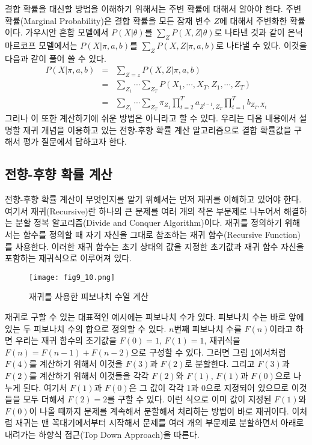 \documentclass[a4paper]{oblivoir}
\begin{document}
결합 확률을 대신할 방법을 이해하기 위해서는 주변 확률에 대해서 알아야 한다. 주변 확률(Marginal Probability)은 결합 확률을 모든 잠재 변수 $Z$에 대해서 주변화한 확률이다. 가우시안 혼합 모델에서 $P(X|\theta)$를 $\sum_{Z} P(X,Z|\theta)$로 나타낸 것과 같이 은닉 마르코프 모델에서는 $P(X|\pi,a,b)$를 $\sum_{Z} P(X,Z|\pi,a,b)$로 나타낼 수 있다. 이것을 다음과 같이 풀어 쓸 수 있다.
\begin{eqnarray}
P(X|\pi,a,b) & = & \sum_{Z=z} P(X,Z|\pi,a,b) \nonumber \\
& = & \sum_{Z_{1}} \cdots \sum_{Z_{T}} P(X_{1},\cdots,X_{T},Z_{1},\cdots,Z_{T}) \nonumber \\
& = & \sum_{Z_{1}} \cdots \sum_{Z_{T}} {\pi}_{Z_{1}} \prod_{t=2}^{T} a_{Z^{t-1},Z_{T}} \prod_{t=1}^{T} b_{Z_{T},X_{t}} \label{eq:9-10}
\end{eqnarray}
그러나 이 또한 계산하기에 쉬운 방법은 아니라고 할 수 있다. 우리는 다음 내용에서 설명할 재귀 개념을 이용하고 있는 전향-후향 확률 계산 알고리즘으로 결합 확률값을 구해서 평가 질문에서 답하고자 한다. \\

\subsection{전향-후향 확률 계산}

전향-후향 확률 계산이 무엇인지를 알기 위해서는 먼저 재귀를 이해하고 있어야 한다. 여기서 재귀(Recursive)란 하나의 큰 문제를 여러 개의 작은 부문제로 나누어서 해결하는 분할 정복 알고리즘(Divide and Conquer Algorithm)이다. 재귀를 정의하기 위해서는 함수를 정의할 때 자기 자신을 그대로 참조하는 재귀 함수(Recursive Function)를 사용한다. 이러한 재귀 함수는 초기 상태의 값을 지정한 초기값과 재귀 함수 자신을 포함하는 재귀식으로 이루어져 있다. \\

\begin{figure}[ht] \centering 
\texttt{[image: fig9\_10.png]} 
\caption{재귀를 사용한 피보나치 수열 계산}
\label{fig:9-10}
\end{figure}

재귀로 구할 수 있는 대표적인 예시에는 피보나치 수가 있다. 피보나치 수는 바로 앞에 있는 두 피보나치 수의 합으로 정의할 수 있다. $n$번째 피보나치 수를 $F(n)$이라고 하면 우리는 재귀 함수의 초기값을 $F(0)=1$, $F(1)=1$, 재귀식을 $F(n) = F(n-1) + F(n-2)$으로 구성할 수 있다.  그러면 그림 \ref{fig:9-10}에서처럼 $F(4)$를 계산하기 위해서 이것을 $F(3)$과 $F(2)$로 분할한다. 그리고 $F(3)$과 $F(2)$를 계산하기 위해서 이것들을 각각 $F(2)$와 $F(1)$, $F(1)$과 $F(0)$으로 나누게 된다. 여기서 $F(1)$과 $F(0)$은 그 값이 각각 1과 0으로 지정되어 있으므로 이것들을 모두 더해서 $F(2)=2$를 구할 수 있다. 이런 식으로 이미 값이 지정된 $F(1)$와 $F(0)$이 나올 때까지 문제를 계속해서 분할해서 처리하는 방법이 바로 재귀이다. 이처럼 재귀는 맨 꼭대기에서부터 시작해서 문제를 여러 개의 부문제로 분할하면서 아래로 내려가는 하향식 접근(Top Down Approach)을 따른다.\\
\end{document}
